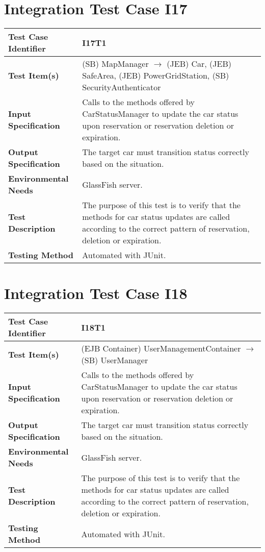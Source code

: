 \section{Integration Test Case I17}

\begin{longtable}{p{} | p{}}
\textbf{Test Case Identifier} & I17T1\\
\hline
\textbf{Test Item(s)} & (SB) MapManager $\rightarrow$ (JEB) Car, (JEB) SafeArea, (JEB) PowerGridStation, (SB) SecurityAuthenticator \\
\hline
\textbf{Input Specification} & Calls to the methods offered by CarStatusManager to update the car status upon reservation or reservation deletion or expiration. \\
\hline
\textbf{Output Specification} & The target car must transition status correctly based on the situation. \\
\hline
\textbf{Environmental Needs} & GlassFish server. \\
\hline
\textbf{Test Description} & The purpose of this test is to verify that the methods for car status updates are called according to the correct pattern of reservation, deletion or expiration. \\
\hline
\textbf{Testing Method} & Automated with JUnit. \\
\hline
\end{longtable}

\section{Integration Test Case I18}

\begin{longtable}{p{} | p{}}
\textbf{Test Case Identifier} & I18T1\\
\hline
\textbf{Test Item(s)} & (EJB Container) UserManagementContainer $\rightarrow$ (SB) UserManager \\
\hline
\textbf{Input Specification} & Calls to the methods offered by CarStatusManager to update the car status upon reservation or reservation deletion or expiration. \\
\hline
\textbf{Output Specification} & The target car must transition status correctly based on the situation. \\
\hline
\textbf{Environmental Needs} & GlassFish server. \\
\hline
\textbf{Test Description} & The purpose of this test is to verify that the methods for car status updates are called according to the correct pattern of reservation, deletion or expiration. \\
\hline
\textbf{Testing Method} & Automated with JUnit. \\
\hline
\end{longtable}

